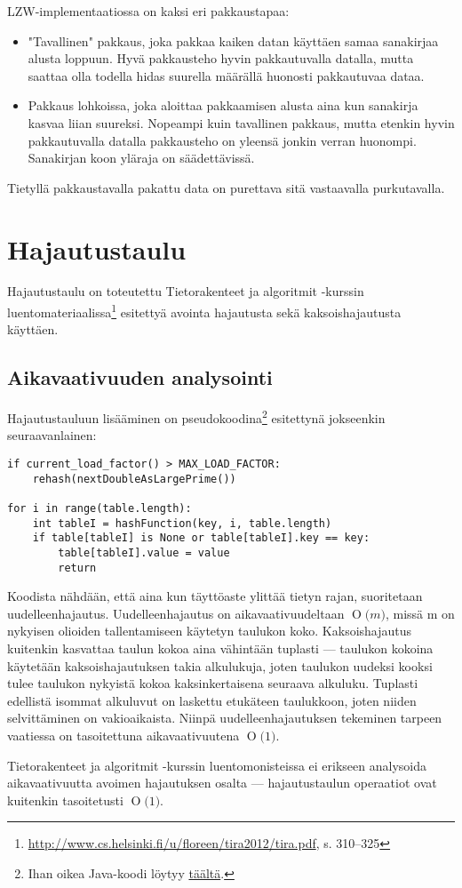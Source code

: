 \documentclass{article}
\newcommand{\BigO}[1]{\ensuremath{\operatorname{O}\bigl(#1\bigr)}}
\begin{document}
LZW-implementaatiossa on kaksi eri pakkaustapaa:
\begin{itemize}
	\item "Tavallinen" pakkaus, joka pakkaa kaiken datan käyttäen samaa sanakirjaa alusta loppuun. Hyvä pakkausteho hyvin pakkautuvalla datalla, mutta saattaa olla todella hidas suurella määrällä huonosti pakkautuvaa dataa.
	\item Pakkaus lohkoissa, joka aloittaa pakkaamisen alusta aina kun sanakirja kasvaa liian suureksi. Nopeampi kuin tavallinen pakkaus, mutta etenkin hyvin pakkautuvalla datalla pakkausteho on yleensä jonkin verran huonompi. Sanakirjan koon yläraja on säädettävissä.
\end{itemize}
Tietyllä pakkaustavalla pakattu data on purettava sitä vastaavalla purkutavalla.

\section {Hajautustaulu}

Hajautustaulu on toteutettu Tietorakenteet ja algoritmit -kurssin luentomateriaalissa\footnote{\url{http://www.cs.helsinki.fi/u/floreen/tira2012/tira.pdf}, s. 310--325} esitettyä avointa hajautusta sekä kaksoishajautusta käyttäen.

\subsection{Aikavaativuuden analysointi}

Hajautustauluun lisääminen on pseudokoodina\footnote{Ihan oikea Java-koodi löytyy \href{https://github.com/Kauhsa/tiralabra-compression/blob/master/project/src/main/java/kauhsa/utils/hashmap/KauhsaHashMap.java}{täältä}.} esitettynä jokseenkin seuraavanlainen:

\begin{lstlisting}
if current_load_factor() > MAX_LOAD_FACTOR:
	rehash(nextDoubleAsLargePrime())

for i in range(table.length):
    int tableI = hashFunction(key, i, table.length)
    if table[tableI] is None or table[tableI].key == key:
        table[tableI].value = value
        return	
\end{lstlisting}

Koodista nähdään, että aina kun täyttöaste ylittää tietyn rajan, suoritetaan uudelleenhajautus. Uudelleenhajautus on aikavaativuudeltaan \BigO{m}, missä m on nykyisen olioiden tallentamiseen käytetyn taulukon koko. Kaksoishajautus kuitenkin kasvattaa taulun kokoa aina vähintään tuplasti --- taulukon kokoina käytetään kaksoishajautuksen takia alkulukuja, joten taulukon uudeksi kooksi tulee taulukon nykyistä kokoa kaksinkertaisena seuraava alkuluku. Tuplasti edellistä isommat alkuluvut on laskettu etukäteen taulukkoon, joten niiden selvittäminen on vakioaikaista. Niinpä uudelleenhajautuksen tekeminen tarpeen vaatiessa on tasoitettuna aikavaativuutena \BigO{1}.

Tietorakenteet ja algoritmit -kurssin luentomonisteissa ei erikseen analysoida aikavaativuutta avoimen hajautuksen osalta --- hajautustaulun operaatiot ovat kuitenkin tasoitetusti \BigO{1}.
\end{document}
